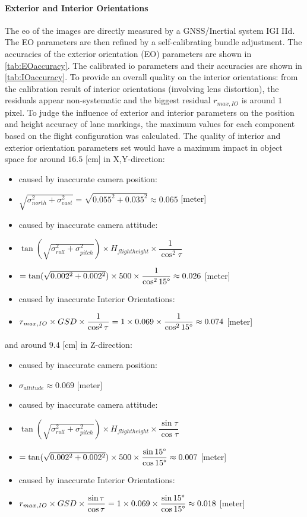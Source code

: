 \paragraph{Exterior and Interior Orientations}
The \gls{eo} of the images are directly measured by a GNSS/Inertial system IGI IId.%
The EO parameters are then refined by a self-calibrating bundle adjustment. The accuracies of the exterior orientation (EO) parameters are shown in \cref{tab:EOaccuracy}. The calibrated \gls{io} parameters and their accuracies are shown in \cref{tab:IOaccuracy}. To provide an overall quality on the interior orientations: from the calibration result of interior orientations (involving lens distortion), the residuals appear non-systematic and the biggest residual $r_{max, IO}$ is around $1$ pixel.
\clearpage %
To judge the influence of exterior and interior parameters on the position and height accuracy of lane markings, the maximum values for each component based on the flight configuration was calculated.
The quality of interior and exterior orientation parameters set would have a maximum impact in object space for around $16.5$ [cm] in X,Y-direction:
\begin{itemize}
      \item caused by inaccurate camera position: 
      \item [] $\sqrt{\sigma_{north}^2+\sigma_{east}^2}=\sqrt{0.055^2+0.035^2}\approx0.065$ [meter]
      \item caused by inaccurate camera attitude:
      \item [] $\tan(\sqrt{\sigma_{roll}^2+\sigma_{pitch}^2})\times H_{flight height}\times\dfrac{1}{\cos^2\tau}$
      \item [] $=\tan(\sqrt{0.002^2+0.002^2})\times 500\times\dfrac{1}{\cos^215\degree}\approx0.026$ [meter]
      \item caused by inaccurate Interior Orientations:
      \item [] $r_{max, IO}\times GSD\times\dfrac{1}{\cos^2\tau}=1\times0.069\times\dfrac{1}{\cos^215\degree}\approx0.074$ [meter]
\end{itemize}
and around $9.4$ [cm] in Z-direction:
\begin{itemize}
      \item caused by inaccurate camera position:
      \item [] $\sigma_{altitude}\approx0.069$ [meter]
      \item caused by inaccurate camera attitude:
      \item [] $\tan(\sqrt{\sigma_{roll}^2+\sigma_{pitch}^2})\times H_{flight height}\times\dfrac{\sin\tau}{\cos\tau}$
      \item [] $=\tan(\sqrt{0.002^2+0.002^2})\times 500\times\dfrac{\sin15\degree}{\cos15\degree}\approx0.007$ [meter]
      \item caused by inaccurate Interior Orientations:
      \item [] $r_{max, IO}\times GSD\times\dfrac{\sin\tau}{\cos\tau}=1\times0.069\times\dfrac{\sin15\degree}{\cos15\degree}\approx0.018$ [meter]
\end{itemize}
